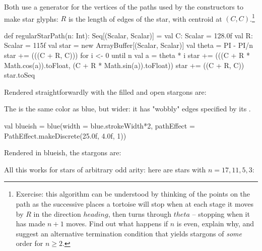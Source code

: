 \documentclass[12pt,a4paper]{article}
\begin{document}
Both use a generator for the vertices of the paths used by
the  constructors to make star glyphs: $R$ is the
length of edges of the star, with centroid at $(C,C)$.\footnote{Exercise: this
algorithm can be understood by thinking of the points on
the path as the successive places a tortoise will stop when
at each stage it moves by $R$ in the direction $heading$, then turns through
$theta$ -- stopping when it has made $n+1$ moves.
Find out what happens if $n$ is even, explain why, and suggest
an alternative termination condition that yields stargons of \textit{some} order for
$n\ge{}2$. }

\begin{scala}
def regularStarPath(n: Int): Seq[(Scalar, Scalar)] = {
    val C: Scalar = 128.0f
    val R: Scalar = 115f
    val star = new ArrayBuffer[(Scalar, Scalar)]
    val theta = PI - PI/n
    star += (((C + R, C)))
    for {i <- 0 until n} {
      val a = theta * i
      star += (((C + R * Math.cos(a)).toFloat, (C + R * Math.sin(a)).toFloat))
    }
    star += ((C + R, C))
    star.toSeq
  }
\end{scala}

Rendered straightforwardly with  the filled and open stargons are:
\begin{center}
\quad\quad
{}
\end{center}


 The   is the same color as blue, but wider: it has "wobbly" edges specified by its
 .

\begin{scala}
  val blueish =
        blue(width      = blue.strokeWidth*2,
             pathEffect = PathEffect.makeDiscrete(25.0f, 4.0f, 1))
\end{scala}

Rendered in blueish, the stargons are:
\begin{center}
\quad\quad
{}
\end{center}

All this works for stars of arbitrary odd arity:
here are  stars with $n=17, 11, 5, 3$:

\begin{center}
\end{center}
\end{document}
